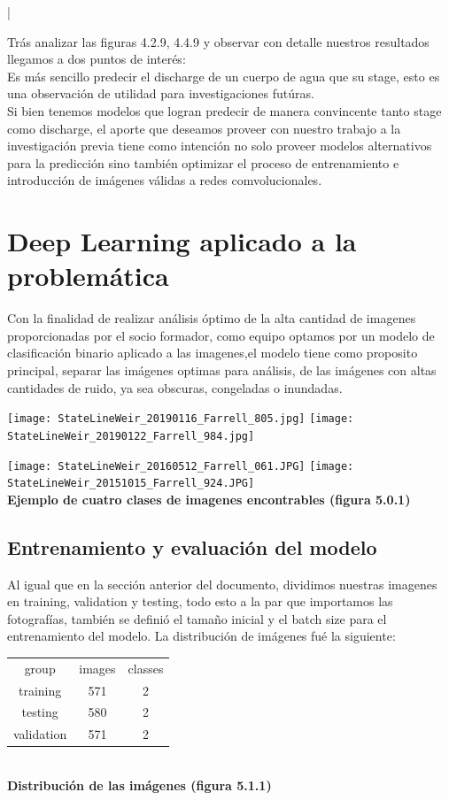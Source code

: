 |\documentclass{article}
\begin{document}
Trás analizar las figuras 4.2.9, 4.4.9 y observar con detalle nuestros resultados llegamos a dos puntos de interés:\\

Es más sencillo predecir el discharge de un cuerpo de agua que su stage, esto es una observación de utilidad para investigaciones futúras.\\
    
Si bien tenemos modelos que logran predecir de manera convincente tanto stage como discharge, el aporte que deseamos proveer con nuestro trabajo a la investigación previa tiene como intención no solo proveer modelos alternativos para la predicción sino también optimizar el proceso de entrenamiento e introducción de imágenes válidas a redes comvolucionales. 


\section{Deep Learning aplicado a la problemática}

Con la finalidad de realizar análisis óptimo de la alta cantidad de imagenes proporcionadas por el socio formador, como equipo optamos por un modelo de clasificación binario aplicado a las imagenes,el modelo tiene como proposito principal, separar las imágenes optimas para análisis, de las imágenes con altas cantidades de ruido, ya sea obscuras, congeladas o inundadas.\\  
\begin{center}
        \texttt{[image: StateLineWeir\_20190116\_Farrell\_805.jpg]} 
        \texttt{[image: StateLineWeir\_20190122\_Farrell\_984.jpg]} \\
\end{center}
\begin{center}
        \texttt{[image: StateLineWeir\_20160512\_Farrell\_061.JPG]} 
        \texttt{[image: StateLineWeir\_20151015\_Farrell\_924.JPG]} \\
    \textbf{Ejemplo de cuatro clases de imagenes encontrables (figura 5.0.1)} 
\end{center}

\subsection{Entrenamiento y evaluación del modelo }


Al igual que en la sección anterior del documento, dividimos nuestras imagenes en training, validation y testing, todo esto a la par que importamos las fotografías, también se definió el tamaño inicial y el batch size para el entrenamiento del modelo. La distribución de imágenes fué la siguiente: 

\begin{center}
    \begin{tabular}{|c|c|c|}
    \hline
    group & images & classes  \\
    training & 571 & 2  \\
    testing & 580 & 2  \\
    validation & 571 & 2  \\
    \hline
    \end{tabular}\\
    
    \textbf{Distribución de las imágenes (figura 5.1.1)}
\end{center}
\end{document}
